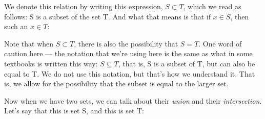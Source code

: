 \documentclass[pdftex, brazil, 12pt, twoside]{article}
\begin{document}
\begin{figure}[H]
  \begin{center}
  \end{center}
\end{figure}

We denote this relation by writing this expression, $S \subset T$, which
we read as follows: S is a subset of the set T.
And what that means is that if $x \in S$, then
such an $x \in T$:

\begin{figure}[H]
  \begin{center}
  \end{center}
\end{figure}

Note that when $S \subset T$, there is also the possibility that $S=T$.
One word of caution here ---
the notation that we're using here is the same as what in
some textbooks is written this way: $S \subseteq T$,
that is, S is a subset of T, but can also be equal to T. We
do not use this notation, but that's how we understand it.
That is, we allow for the possibility that the subset is
equal to the larger set.

Now when we have two sets, we can talk about their \emph{union} and
their \emph{intersection}.
Let's say that this is set S, and this is set T:

\begin{figure}[H]
  \begin{center}
  \end{center}
\end{figure}
\end{document}

